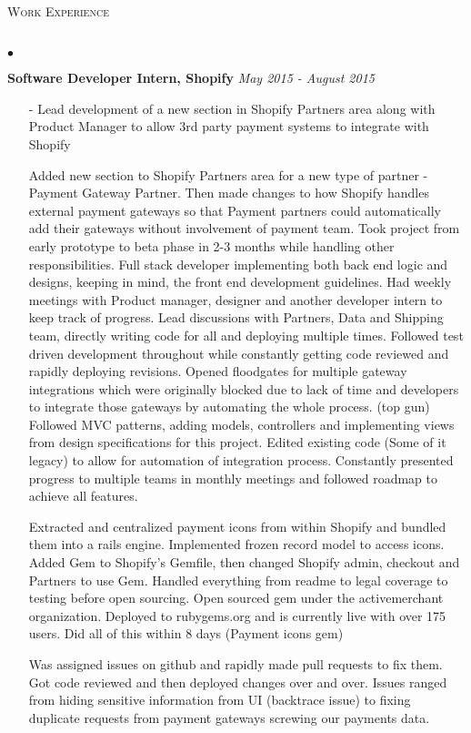 \documentclass[10pt]{article}
\newcommand{\lineunder}{\vspace*{-8pt} \\ \hspace*{-18pt} \hrulefill \\}
\newcommand{\header}[1]{{\hspace*{-15pt}\vspace*{6pt} \textsc{#1}} \vspace*{-6pt} \lineunder}
\newenvironment{achievements}{\begin{list}{$\bullet$}{\topsep 0pt \itemsep -1.5pt \leftmargin 5pt}}{\vspace*{4pt}\end{list}}
\begin{document}
\header{\normalsize Work Experience}
\begin{achievements}
\item \textbf{Software Developer Intern, Shopify} \hfill \textit {May 2015 - August 2015}
\begin{itemize}
\item[-]Lead development of a new section in Shopify Partners area along with Product Manager to allow 3rd party payment systems to integrate with Shopify

Added new section to Shopify Partners area for a new type of partner - Payment Gateway Partner. Then made changes to how Shopify handles external payment gateways so that Payment partners could automatically add their gateways without involvement of payment team. Took project from early prototype to beta phase in 2-3 months while handling other responsibilities. Full stack developer implementing both back end logic and designs, keeping in mind, the front end development guidelines. Had weekly meetings with Product manager, designer and another developer intern to keep track of progress. Lead discussions with Partners, Data and Shipping team, directly writing code for all and deploying multiple times. Followed test driven development throughout while constantly getting code reviewed and rapidly deploying revisions. Opened floodgates for multiple gateway integrations which were originally blocked due to lack of time and developers to integrate those gateways by automating the whole process. (top gun)
Followed MVC patterns, adding models, controllers and implementing views from design specifications for this project. Edited existing code (Some of it legacy) to allow for automation of integration process.
Constantly presented progress to multiple teams in monthly meetings and followed roadmap to achieve all features.

Extracted and centralized payment icons from within Shopify and bundled them into a rails engine. Implemented frozen record model to access icons. Added Gem to Shopify's Gemfile, then changed Shopify admin, checkout and Partners to use Gem. Handled everything from readme to legal coverage to testing before open sourcing. Open sourced gem under the activemerchant organization. Deployed to rubygems.org and is currently live with over 175 users. Did all of this within 8 days (Payment icons gem)

Was assigned issues on github and rapidly made pull requests to fix them. Got code reviewed and then deployed changes over and over.
Issues ranged from hiding sensitive information from UI (backtrace issue) to fixing duplicate requests from payment gateways screwing our payments data.


\end{itemize}
\end{achievements}
\end{document}
